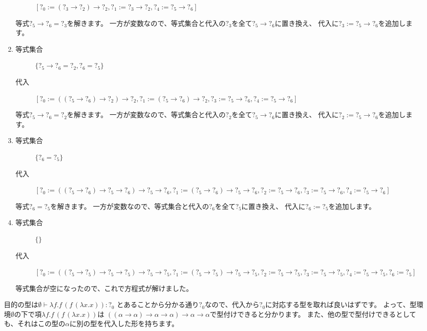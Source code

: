 \begin{enumerate}
\begin{description}
       $[?_0 := (?_3 \to ?_2) \to ?_2, ?_1 := ?_3 \to ?_2, ?_4 := ?_5 \to ?_6]$
    \end{description}
    等式$?_5 \to ?_6 = ?_3$を解きます。
    一方が変数なので、等式集合と代入の$?_3$を全て$?_5 \to ?_6$に置き換え、
    代入に$?_3 := ?_5 \to ?_6$を追加します。
  \item
    \begin{description}
      \item[等式集合]
       $\{?_5 \to ?_6 = ?_2, ?_6 = ?_5\}$
      \item[代入]
       $[?_0 := ((?_5 \to ?_6) \to ?_2) \to ?_2, ?_1 := (?_5 \to ?_6) \to ?_2,
          ?_3 := ?_5 \to ?_6, ?_4 := ?_5 \to ?_6]$
    \end{description}
    等式$?_5 \to ?_6 = ?_2$を解きます。
    一方が変数なので、等式集合と代入の$?_2$を全て$?_5 \to ?_6$に置き換え、
    代入に$?_2 := ?_5 \to ?_6$を追加します。
  \item
    \begin{description}
      \item[等式集合]
       $\{?_6 = ?_5\}$
      \item[代入]
       $[?_0 := ((?_5 \to ?_6) \to ?_5 \to ?_6) \to ?_5 \to ?_6,
          ?_1 := (?_5 \to ?_6) \to ?_5 \to ?_6, ?_2 := ?_5 \to ?_6, ?_3 := ?_5 \to ?_6,
          ?_4 := ?_5 \to ?_6]$
    \end{description}
    等式$?_6 = ?_5$を解きます。
    一方が変数なので、等式集合と代入の$?_6$を全て$?_5$に置き換え、
    代入に$?_6 := ?_5$を追加します。
  \item
    \begin{description}
      \item[等式集合]
       $\{\}$
      \item[代入]
       $[?_0 := ((?_5 \to ?_5) \to ?_5 \to ?_5) \to ?_5 \to ?_5,
          ?_1 := (?_5 \to ?_5) \to ?_5 \to ?_5, ?_2 := ?_5 \to ?_5, ?_3 := ?_5 \to ?_5,
          ?_4 := ?_5 \to ?_5, ?_6 := ?_5]$
    \end{description}
    等式集合が空になったので、これで方程式が解けました。
\end{enumerate}

目的の型は$\emptyset \vdash \lambda f . f \, (f \, (\lambda x . x)) : ?_0$
とあることから分かる通り$?_0$なので、代入から$?_0$に対応する型を取れば良いはずです。
よって、型環境$\emptyset$の下で項$\lambda f . f \, (f \, (\lambda x . x))$は
$((\alpha \to \alpha) \to \alpha \to \alpha) \to \alpha \to \alpha$で型付けできると分かります。
また、他の型で型付けできるとしても、それはこの型の$\alpha$に別の型を代入した形を持ちます。

